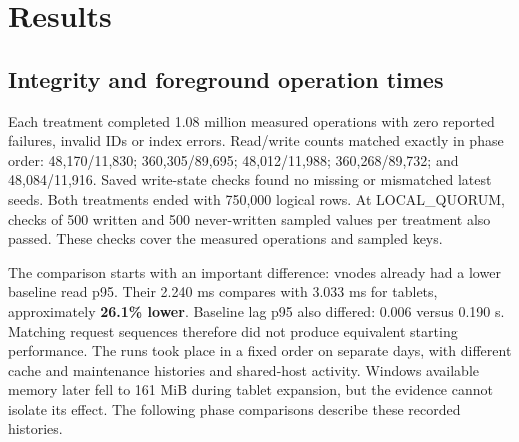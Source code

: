 \newpage

\hypertarget{results}{%
\section{Results}\label{results}}

\hypertarget{integrity-and-foreground-operation-times}{%
\subsection{Integrity and foreground operation
times}\label{integrity-and-foreground-operation-times}}

Each treatment completed 1.08 million measured operations with zero reported failures, invalid IDs or index errors. Read/write counts matched exactly in phase order: 48,170/11,830; 360,305/89,695; 48,012/11,988; 360,268/89,732; and 48,084/11,916. Saved write-state checks found no missing or mismatched latest seeds. Both treatments ended with 750,000 logical rows. At LOCAL\_QUORUM, checks of 500 written and 500 never-written sampled values per treatment also passed. These checks cover the measured operations and sampled keys.

The comparison starts with an important difference: vnodes already had a lower baseline read p95. Their 2.240 ms compares with 3.033 ms for tablets, approximately \textbf{26.1\% lower}. Baseline lag p95 also differed: 0.006 versus 0.190 s. Matching request sequences therefore did not produce equivalent starting performance. The runs took place in a fixed order on separate days, with different cache and maintenance histories and shared-host activity. Windows available memory later fell to 161 MiB during tablet expansion, but the evidence cannot isolate its effect. The following phase comparisons describe these recorded histories.

